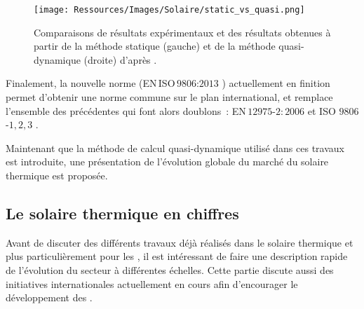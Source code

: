 \begin{figure}
    \centering
    \texttt{[image: Ressources/Images/Solaire/static\_vs\_quasi.png]}
    \caption[Comparaison entre la méthode statique et la méthode quasi-dynamique]
            {Comparaisons de résultats expérimentaux et des résultats obtenues
             à partir de la méthode statique (gauche) et de la méthode quasi-dynamique (droite)
             d’après \textcite{Zambolin20101382}.}
    \label{fig:compare_static_quasi_dyn}
\end{figure}

Finalement, la nouvelle norme (EN\,ISO\,$9806$:$2013$ ) actuellement en finition permet d’obtenir
une norme commune sur le plan international, et remplace l’ensemble des précédentes qui font alors doublons~:
EN\,$12975$-$2:2006$ et ISO $9806$-$1,2,3$ \parencite{ISO98062013}.

Maintenant que la méthode de calcul quasi-dynamique utilisé dans ces travaux est
introduite, une présentation de l’évolution globale du marché du solaire thermique
est proposée.


\subsection{Le solaire thermique en chiffres} %
\label{sub:le_solaire_thermique_en_chiffres}
Avant de discuter des différents travaux déjà réalisés dans le solaire thermique
et plus particulièrement pour les , il est intéressant de faire une description
rapide de l’évolution du secteur à différentes échelles. Cette partie discute aussi
des initiatives internationales actuellement en cours afin d’encourager le développement des
.

